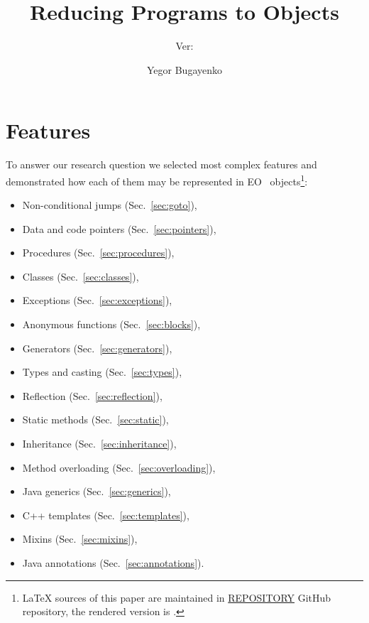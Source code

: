 \documentclass[sigplan,11pt,nonacm,natbib=false]{acmart}
\title{Reducing Programs to Objects}
\subtitle{
  Ver:
  \texorpdfstring{
    \href{https://github.com/REPOSITORY/releases/tag/0.0.0}
      {\ff{0.0.0}}
  }{0.0.0}
}
\author{Yegor Bugayenko}
\affiliation{\institution{Huawei}\country{Russia}\city{Moscow}}
\begin{document}
\raggedbottom

\maketitle

\section{Features}

To answer our research question we selected most complex features and demonstrated how each of them may be represented in EO~\citep{bugayenko2021eolang} objects\footnote{%
\LaTeX{} sources of this paper are maintained in
\href{https://github.com/REPOSITORY}{REPOSITORY} GitHub repository,
the rendered version is \href{https://github.com/REPOSITORY/releases/tag/0.0.0}{}.}:

\begin{itemize}
    \item Non-conditional jumps
      (Sec.~\ref{sec:goto}),
    \item Data and code pointers
      (Sec.~\ref{sec:pointers}),
    \item Procedures
      (Sec.~\ref{sec:procedures}),
    \item Classes
        (Sec.~\ref{sec:classes}),
    \item Exceptions
        (Sec.~\ref{sec:exceptions}),
    \item Anonymous functions
        (Sec.~\ref{sec:blocks}),
    \item Generators
        (Sec.~\ref{sec:generators}),
    \item Types and casting
        (Sec.~\ref{sec:types}),
    \item Reflection
        (Sec.~\ref{sec:reflection}),
    \item Static methods
        (Sec.~\ref{sec:static}),
    \item Inheritance
        (Sec.~\ref{sec:inheritance}),
    \item Method overloading
        (Sec.~\ref{sec:overloading}),
    \item Java generics
        (Sec.~\ref{sec:generics}),
    \item C++ templates
        (Sec.~\ref{sec:templates}),
    \item Mixins
        (Sec.~\ref{sec:mixins}),
    \item Java annotations
        (Sec.~\ref{sec:annotations}).
\end{itemize}
\end{document}
